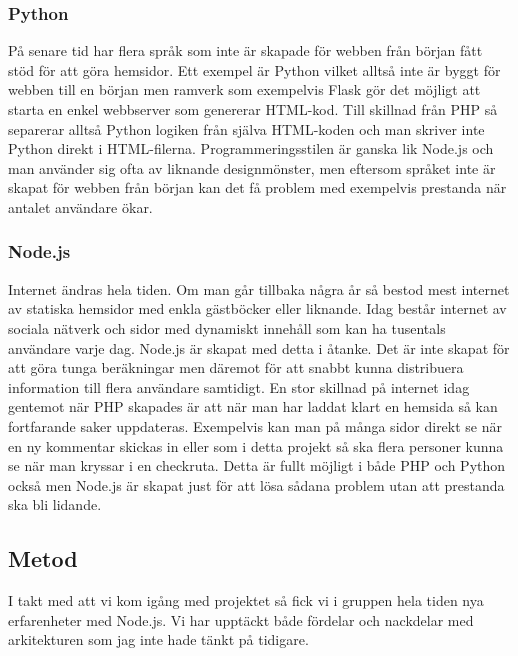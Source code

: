 
\subsubsection{Python}

På senare tid har flera språk som inte är skapade för webben från början fått stöd för att göra hemsidor. Ett exempel är Python vilket alltså inte är byggt för webben till en början men ramverk som exempelvis Flask\cite{python_flask} gör det möjligt att starta en enkel webbserver som genererar HTML-kod. Till skillnad från PHP så separerar alltså Python logiken från själva HTML-koden och man skriver inte Python direkt i HTML-filerna. Programmeringsstilen är ganska lik Node.js och man använder sig ofta av liknande designmönster, men eftersom språket inte är skapat för webben från början kan det få problem med exempelvis prestanda när antalet användare ökar.

\subsubsection{Node.js}
Internet ändras hela tiden. Om man går tillbaka några år så bestod mest internet av statiska hemsidor med enkla gästböcker eller liknande. Idag består internet av sociala nätverk och sidor med dynamiskt innehåll som kan ha tusentals användare varje dag. Node.js är skapat med detta i åtanke. Det är inte skapat för att göra tunga beräkningar men däremot för att snabbt kunna distribuera information till flera användare samtidigt. En stor skillnad på internet idag gentemot när PHP skapades är att när man har laddat klart en hemsida så kan fortfarande saker uppdateras. Exempelvis kan man på många sidor direkt se när en ny kommentar skickas in eller som i detta projekt så ska flera personer kunna se när man kryssar i en checkruta. Detta är fullt möjligt i både PHP och Python också men Node.js är skapat just för att lösa sådana problem utan att prestanda ska bli lidande.

\subsection{Metod}

I takt med att vi kom igång med projektet så fick vi i gruppen hela tiden nya erfarenheter med Node.js. Vi har upptäckt både fördelar och nackdelar med arkitekturen som jag inte hade tänkt på tidigare. 


